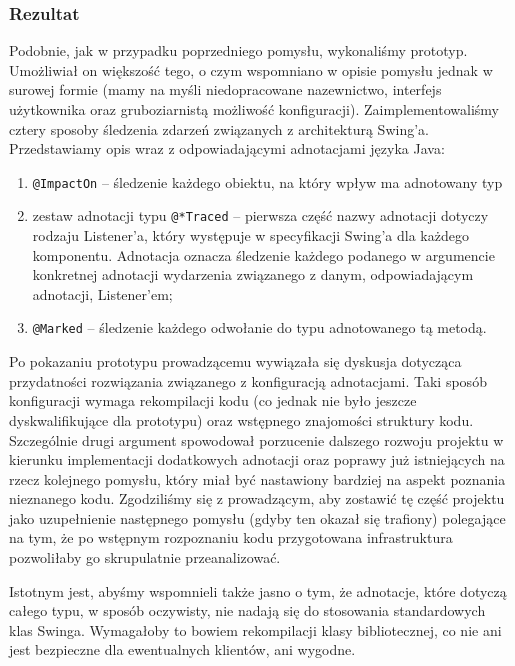 \documentclass[12pt,a4paper,titlepage]{article}
\begin{document}
 \subsubsection*{Rezultat}
  Podobnie, jak w przypadku poprzedniego pomysłu, wykonaliśmy prototyp. Umożliwiał on większość tego, o czym wspomniano w opisie pomysłu jednak w surowej formie (mamy na myśli niedopracowane nazewnictwo, interfejs użytkownika oraz gruboziarnistą możliwość konfiguracji). Zaimplementowaliśmy cztery sposoby śledzenia zdarzeń związanych z architekturą Swing'a. Przedstawiamy opis wraz z odpowiadającymi adnotacjami języka Java:
  \begin{enumerate}
   \item \texttt{@ImpactOn} -- śledzenie każdego obiektu, na który wpływ ma adnotowany typ 
   \item zestaw adnotacji typu \texttt{@*Traced} -- pierwsza część nazwy adnotacji dotyczy rodzaju Listener'a, który występuje w specyfikacji Swing'a dla każdego komponentu. Adnotacja oznacza śledzenie każdego podanego w argumencie konkretnej adnotacji wydarzenia związanego z danym, odpowiadającym adnotacji, Listener'em;
   \item \texttt{@Marked} -- śledzenie każdego odwołanie do typu adnotowanego tą metodą.
  \end{enumerate}
  
  Po pokazaniu prototypu prowadzącemu wywiązała się dyskusja dotycząca przydatności rozwiązania związanego z konfiguracją adnotacjami. Taki sposób konfiguracji wymaga rekompilacji kodu (co jednak nie było jeszcze dyskwalifikujące dla prototypu) oraz wstępnego znajomości struktury kodu. Szczególnie drugi argument spowodował porzucenie dalszego rozwoju projektu w kierunku implementacji dodatkowych adnotacji oraz poprawy już istniejących na rzecz kolejnego pomysłu, który miał być nastawiony bardziej na aspekt poznania nieznanego kodu. Zgodziliśmy się z prowadzącym, aby zostawić tę część projektu jako uzupełnienie następnego pomysłu (gdyby ten okazał się trafiony) polegające na tym, że po wstępnym rozpoznaniu kodu przygotowana infrastruktura pozwoliłaby go skrupulatnie przeanalizować.
  
  Istotnym jest, abyśmy wspomnieli także jasno o tym, że adnotacje, które dotyczą całego typu, w sposób oczywisty, nie nadają się do stosowania standardowych klas Swinga. Wymagałoby to bowiem rekompilacji klasy bibliotecznej, co nie ani jest bezpieczne dla ewentualnych klientów, ani wygodne.
\end{document}
